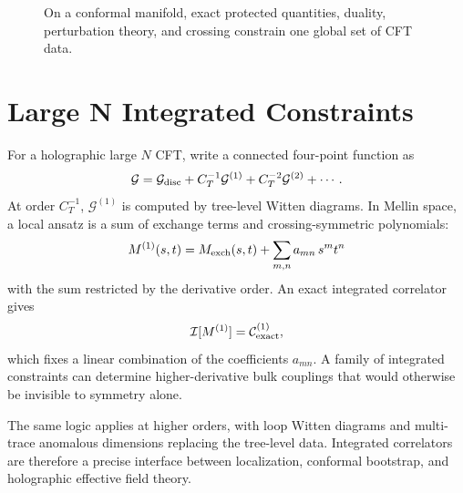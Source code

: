 \begin{figure}[H]
  \centering
  \caption{On a conformal manifold, exact protected quantities, duality,
  perturbation theory, and crossing constrain one global set of CFT data.}
  \label{fig:global-bootstrap-conformal-manifold}
\end{figure}

\section{Large N Integrated Constraints}

For a holographic large \(N\) CFT, write a connected four-point function as
\[
  \mathcal G
  =
  \mathcal G_{\rm disc}
  +
  C_T^{-1}\mathcal G^{(1)}
  +
  C_T^{-2}\mathcal G^{(2)}
  +\cdots .
\]
At order \(C_T^{-1}\), \(\mathcal G^{(1)}\) is computed by tree-level Witten
diagrams.  In Mellin space, a local ansatz is a sum of exchange terms and
crossing-symmetric polynomials:
\[
  M^{(1)}(s,t)
  =
  M_{\rm exch}(s,t)
  +
  \sum_{m,n} a_{mn}\,s^m t^n
\]
with the sum restricted by the derivative order.  An exact integrated
correlator gives
\[
  \mathcal I[M^{(1)}]=\mathcal C^{(1)}_{\rm exact},
\]
which fixes a linear combination of the coefficients \(a_{mn}\).  A family of
integrated constraints can determine higher-derivative bulk couplings that
would otherwise be invisible to symmetry alone.

The same logic applies at higher orders, with loop Witten diagrams and
multi-trace anomalous dimensions replacing the tree-level data.  Integrated
correlators are therefore a precise interface between localization, conformal
bootstrap, and holographic effective field theory.
